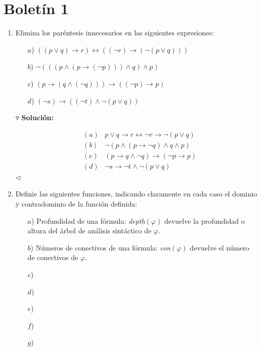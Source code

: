 \documentclass{article}
\begin{document}
\section*{\LARGE{Boletín 1}}
\begin{enumerate}
\item Elimina los paréntesis innecesarios en las siguientes expresiones:
  \begin{itemize}
  \item[$a$)] $\left((p \lor q) \rightarrow r\right) \leftrightarrow \left((\neg r) \rightarrow (\neg (p \lor q))\right)$
  \item[$b$)] $\neg \left(((p \land (p \rightarrow (\neg p))) \land q) \land p\right)$
  \item[$c$)] $\left(p \rightarrow (q \land (\neg q)) \right) \rightarrow \left((\neg p) \rightarrow p\right)$
  \item[$d$)] $(\neg s) \rightarrow \left((\neg t) \land \neg (p \lor q)\right)$
  \end{itemize}
  
  $\triangledown$ \textbf{Solución:}
  
  \begin{eqnarray*}
    &(a)& p \lor q \rightarrow r \leftrightarrow \neg r \rightarrow \neg (p \lor q)\\
    &(b)& \neg (p \land (p \rightarrow \neg q) \land q \land p)\\
    &(c)& (p \rightarrow q \land \neg q) \rightarrow (\neg p \rightarrow p)\\
    &(d)& \neg s \rightarrow \neg t \land \neg (p \lor q)
  \end{eqnarray*}
  \hfill $\lhd$
\item Definie las siguientes funciones, indicando claramente en cada caso el dominio
  y contradominio de la función definida:
  \begin{itemize}
  \item[$a$)] Profundidad de una fórmula: \textit{depth}$(\varphi)$ devuelve la
    profundidad o altura del árbol de análisis sintáctico de $\varphi$.
  \item[$b$)] Números de conectivos de una fórmula: \textit{con}$(\varphi)$
    devuelve el número de conectivos de $\varphi$.
  \item[$c$)] 
  \item[$d$)] 
  \item[$e$)] 
  \item[$f$)] 
  \item[$g$)] 
  \end{itemize}
\end{enumerate}
\end{document}
